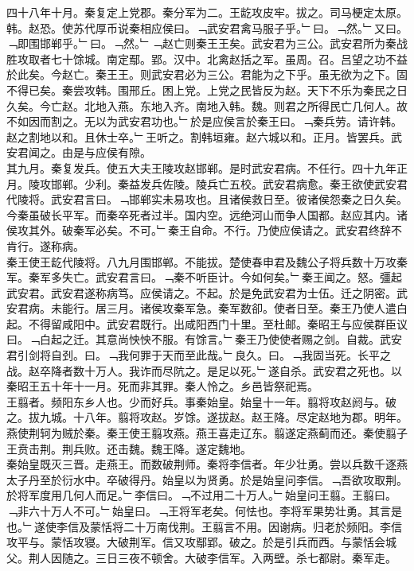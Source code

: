 \documentclass{zhvt-classic}
\begin{document}
\hspace*{2em}四十八年十月。秦复定上党郡。秦分军为二。王龁攻皮牢。拔之。司马梗定太原。韩。赵恐。使苏代厚币说秦相应侯曰。﹁武安君禽马服子乎。﹂曰。﹁然。﹂又曰。﹁即围邯郸乎。﹂曰。﹁然。﹂﹁赵亡则秦王王矣。武安君为三公。武安君所为秦战胜攻取者七十馀城。南定鄢。郢。汉中。北禽赵括之军。虽周。召。吕望之功不益於此矣。今赵亡。秦王王。则武安君必为三公。君能为之下乎。虽无欲为之下。固不得已矣。秦尝攻韩。围邢丘。困上党。上党之民皆反为赵。天下不乐为秦民之日久矣。今亡赵。北地入燕。东地入齐。南地入韩。魏。则君之所得民亡几何人。故不如因而割之。无以为武安君功也。﹂於是应侯言於秦王曰。﹁秦兵劳。请许韩。赵之割地以和。且休士卒。﹂王听之。割韩垣雍。赵六城以和。正月。皆罢兵。武安君闻之。由是与应侯有隙。\\
\hspace*{2em}其九月。秦复发兵。使五大夫王陵攻赵邯郸。是时武安君病。不任行。四十九年正月。陵攻邯郸。少利。秦益发兵佐陵。陵兵亡五校。武安君病愈。秦王欲使武安君代陵将。武安君言曰。﹁邯郸实未易攻也。且诸侯救日至。彼诸侯怨秦之日久矣。今秦虽破长平军。而秦卒死者过半。国内空。远绝河山而争人国都。赵应其内。诸侯攻其外。破秦军必矣。不可。﹂秦王自命。不行。乃使应侯请之。武安君终辞不肯行。遂称病。\\
\hspace*{2em}秦王使王龁代陵将。八九月围邯郸。不能拔。楚使春申君及魏公子将兵数十万攻秦军。秦军多失亡。武安君言曰。﹁秦不听臣计。今如何矣。﹂秦王闻之。怒。彊起武安君。武安君遂称病笃。应侯请之。不起。於是免武安君为士伍。迁之阴密。武安君病。未能行。居三月。诸侯攻秦军急。秦军数卻。使者日至。秦王乃使人遣白起。不得留咸阳中。武安君既行。出咸阳西门十里。至杜邮。秦昭王与应侯群臣议曰。﹁白起之迁。其意尚怏怏不服。有馀言。﹂秦王乃使使者赐之剑。自裁。武安君引剑将自刭。曰。﹁我何罪于天而至此哉。﹂良久。曰。﹁我固当死。长平之战。赵卒降者数十万人。我诈而尽阬之。是足以死。﹂遂自杀。武安君之死也。以秦昭王五十年十一月。死而非其罪。秦人怜之。乡邑皆祭祀焉。\\
\hspace*{2em}王翦者。频阳东乡人也。少而好兵。事秦始皇。始皇十一年。翦将攻赵阏与。破之。拔九城。十八年。翦将攻赵。岁馀。遂拔赵。赵王降。尽定赵地为郡。明年。燕使荆轲为贼於秦。秦王使王翦攻燕。燕王喜走辽东。翦遂定燕蓟而还。秦使翦子王贲击荆。荆兵败。还击魏。魏王降。遂定魏地。\\
\hspace*{2em}秦始皇既灭三晋。走燕王。而数破荆师。秦将李信者。年少壮勇。尝以兵数千逐燕太子丹至於衍水中。卒破得丹。始皇以为贤勇。於是始皇问李信。﹁吾欲攻取荆。於将军度用几何人而足。﹂李信曰。﹁不过用二十万人。﹂始皇问王翦。王翦曰。﹁非六十万人不可。﹂始皇曰。﹁王将军老矣。何怯也。李将军果势壮勇。其言是也。﹂遂使李信及蒙恬将二十万南伐荆。王翦言不用。因谢病。归老於频阳。李信攻平与。蒙恬攻寝。大破荆军。信又攻鄢郢。破之。於是引兵而西。与蒙恬会城父。荆人因随之。三日三夜不顿舍。大破李信军。入两壁。杀七都尉。秦军走。\\
\end{document}
